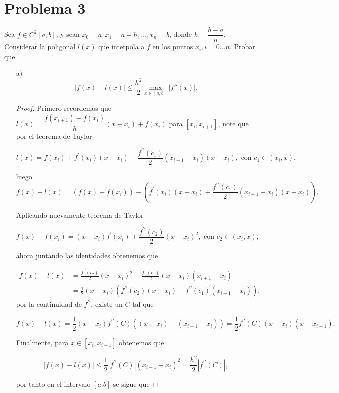 
\section{Problema 3}
Sea $f \in C^2[a, b]$, y sean $x_0 = a, x_1 = a + h, \dots, x_n = b$, donde $h = \dfrac{b-a}{n}$. Considerar la poligonal $l(x)$ que interpola a $f$ en los puntos $x_i, i = 0 \dots n$. Probar que

\begin{itemize}
    \item[a)]$$|f(x) - l(x)| \leq \frac{h^2}{2} \max_{x \in [a,b]} |f''(x)|.$$

    \begin{proof}
        Primero recordemos que $l(x)=\dfrac{f(x_{i+1})-f(x_i)}{h}(x-x_i)+f(x_i)$ para $[x_i,x_{i+1}]$, note  que por el teorema de Taylor

        $$l(x)=f(x_i)+f^{\prime}(x_i)(x-x_i)+\frac{f^{\prime\prime}(c_1)}{2}(x_{i+1}-x_i)(x-x_i), \text{ con } c_1\in (x_i,x),$$

        luego 
        $$f(x)-l(x)=(f(x)-f(x_i))-\left(f^{\prime}(x_i)(x-x_i)+\frac{f^{\prime\prime}(c_1)}{2}(x_{i+1}-x_i)(x-x_i)\right).$$

        Aplicando nuevamente teorema de Taylor

        $$f(x)-f(x_i)=(x-x_i)f^{\prime}(x_i)+\dfrac{f^{\prime\prime}(c_2)}{2}(x-x_i)^2, \text{ con }c_2\in (x_i,x),$$

        ahora juntando las identidades obtenemos que

        \begin{align*}
            f(x)-l(x)&=\frac{f^{\prime\prime}(c_2)}{2}(x-x_i)^2-\frac{f^{\prime\prime}(c_1)}{2}(x-x_i)(x_{i+1}-x_i)\\
            &=\frac{1}{2}(x-x_i)(f^{\prime\prime}(c_2)(x-x_i)-f^{\prime\prime}(c_1)(x_{i+1}-x_i))
        .\end{align*}
        por la continuidad de $f^{\prime\prime}$, existe un $C$ tal que 

        $$f(x)-l(x)=\frac{1}{2}(x-x_i)f^{\prime\prime}(C)((x-x_i)-(x_{i+1}-x_i))=\frac{1}{2}f^{\prime\prime}(C)(x-x_i)(x-x_{i+1}).$$

        Finalmente, para $x\in [x_i,x_{i+1}]$ obtenemos que

        $$|f(x)-l(x)|\leq\frac{1}{2}|f^{\prime\prime}(C)|(x_{i+1}-x_i)^2=\frac{h^2}{2}|f^{\prime\prime}(C)|,$$

        por tanto en el intervalo $[a.b]$ se sigue que


\end{proof}
\end{itemize}
